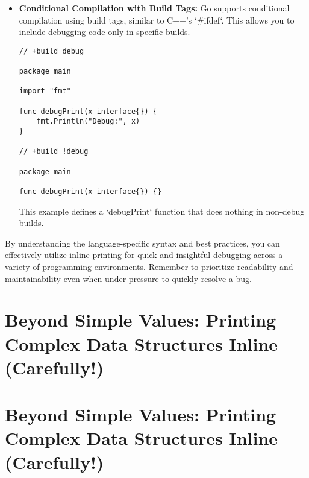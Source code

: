 \documentclass{article}
\begin{document}
{{{{\begin{itemize}
\begin{verbatim}
defer fmt.Println("Function completed. Result:", result)
result := calculateValue(x + y)
\end{verbatim}

        This is especially useful in functions that might exit prematurely due to errors.

    \item \textbf{Conditional Compilation with Build Tags:} Go supports conditional compilation using build tags, similar to C++'s `#ifdef`. This allows you to include debugging code only in specific builds.

\begin{verbatim}
// +build debug

package main

import "fmt"

func debugPrint(x interface{}) {
    fmt.Println("Debug:", x)
}

// +build !debug

package main

func debugPrint(x interface{}) {}
\end{verbatim}

        This example defines a `debugPrint` function that does nothing in non-debug builds.
\end{itemize}

By understanding the language-specific syntax and best practices, you can effectively utilize inline printing for quick and insightful debugging across a variety of programming environments. Remember to prioritize readability and maintainability even when under pressure to quickly resolve a bug.

\newpage

\section*{Beyond Simple Values: Printing Complex Data Structures Inline (Carefully!)} %
\label{chapter-6-10-Beyond_Simple_Values__Printing_Complex_D}

\section*{Beyond Simple Values: Printing Complex Data Structures Inline (Carefully!)}

}}}}
\end{document}
